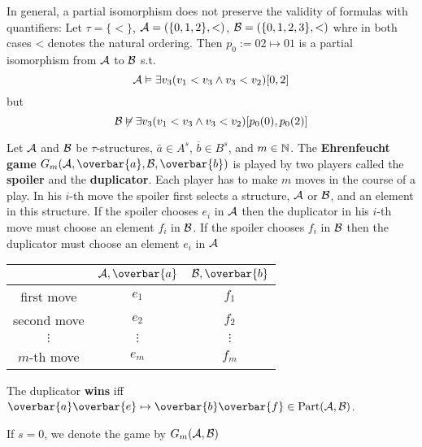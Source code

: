 \documentclass[11pt]{article}
\def \Part {\text{Part}}
\begin{document}
In general, a partial isomorphism does not preserve the validity of formulas with quantifiers:
Let \(\tau=\{<\}\), \(\mathcal{A}=(\{0,1,2\},<)\), \(\mathcal{B}=(\{0,1,2,3\},<)\) whre in both cases <
denotes the natural ordering. Then \(p_0:=02\mapsto 01\) is a partial isomorphism from \(\mathcal{A}\)
to \(\mathcal{B}\) s.t.
\begin{equation*}
\mathcal{A}\vDash\exists v_3(v_1<v_3\wedge v_3<v_2)[0,2]
\end{equation*}
but
\begin{equation*}
\mathcal{B}\not\vDash\exists v_3(v_1<v_3\wedge v_3<v_2)[p_0(0),p_0(2)]
\end{equation*}



Let \(\mathcal{A}\) and \(\mathcal{B}\) be \(\tau\)-structures, \(\bar{a}\in A^s\),
\(\overbar{b}\in B^s\), and \(m\in\mathbb{N}\). The \textbf{Ehrenfeucht game}
\(G_m(\cala,\overbar{a},\calb,\overbar{b})\) is played by two players called
the \textbf{spoiler} and the \textbf{duplicator}. Each player has to make \(m\) moves in
the course of a play. In his \(i\)-th move the spoiler first selects a
structure, \(\mathcal{A}\) or \(\mathcal{B}\), and an element in this structure. If the
spoiler chooses \(e_i\) in \(\mathcal{A}\) then the duplicator in his \(i\)-th move
must choose an element \(f_i\) in \(\mathcal{B}\). If the spoiler chooses \(f_i\)
in \(\mathcal{B}\) then the duplicator must choose an element \(e_i\) in \(\mathcal{A}\)

\begin{center}
\begin{tabular}{cc|c}
 & \(\cala,\overbar{a}\) & \(\calb,\overbar{b}\)\\
\hline
first move & \(e_1\) & \(f_1\)\\
second move & \(e_2\) & \(f_2\)\\
\(\vdots\) & \(\vdots\) & \(\vdots\)\\
\(m\)-th move & \(e_m\) & \(f_m\)\\
\end{tabular}
\end{center}

The duplicator \textbf{wins} iff
\(\overbar{a}\overbar{e}\mapsto\overbar{b}\overbar{f}\in\Part(\cala,\calb)\).

If \(s=0\), we denote the game by \(G_m(\mathcal{A},\mathcal{B})\)

\subsection{}
\label{sec:org7fb5302}
\end{document}
